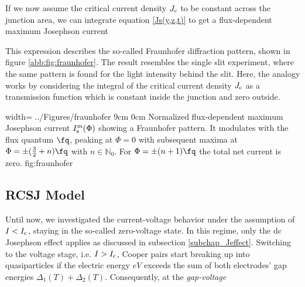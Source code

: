 If we now assume the critical current density $J_{\rm c}$ to be constant across the junction area, we can integrate equation \ref{Js(y,z,t)} to get a flux-dependent maximum Josephson current


This expression describes the so-called Fraunhofer diffraction pattern, shown in figure \ref{abb:fig:fraunhofer}. The result resembles the single slit experiment, where the same pattern is found for the light intensity behind the slit. Here, the analogy works by considering the integral of the critical current density $J_{\rm c}$ as a transmission function which is constant inside the junction and zero outside. 

{width=\textwidth}
{../Figures/fraunhofer}
{9cm}
{0cm}
{Normalized flux-dependent maximum Josephson current $I_{\rm s}^{\rm m}(\Phi)$ showing a Fraunhofer pattern. It modulates with the flux quantum $\unit{\fq}$, peaking at $\Phi=0$ with subsequent maxima at $\Phi=\pm(\frac{3}{2}+n)\unit{\fq}$ with $n\in\mathbb{N}_0$. For $\Phi=\pm(n+1)\unit{\fq}$ the total net current is zero.} 
{fig:fraunhofer}


\subsection{RCSJ Model}

Until now, we investigated the current-voltage behavior under the assumption of $I<I_{\rm c}$, staying in the so-called zero-voltage state. In this regime, only the dc Josephson effect applies as discussed in subsection \ref{subchap_Jeffect}. Switching to the voltage stage, i.e. $I>I_{\rm c}$, Cooper pairs start breaking up into quasiparticles if the electric energy $eV$ exceeds the sum of both electrodes' gap energies $\Delta_1(T) + \Delta_2(T)$. Consequently, at the \textit{gap-voltage} 


